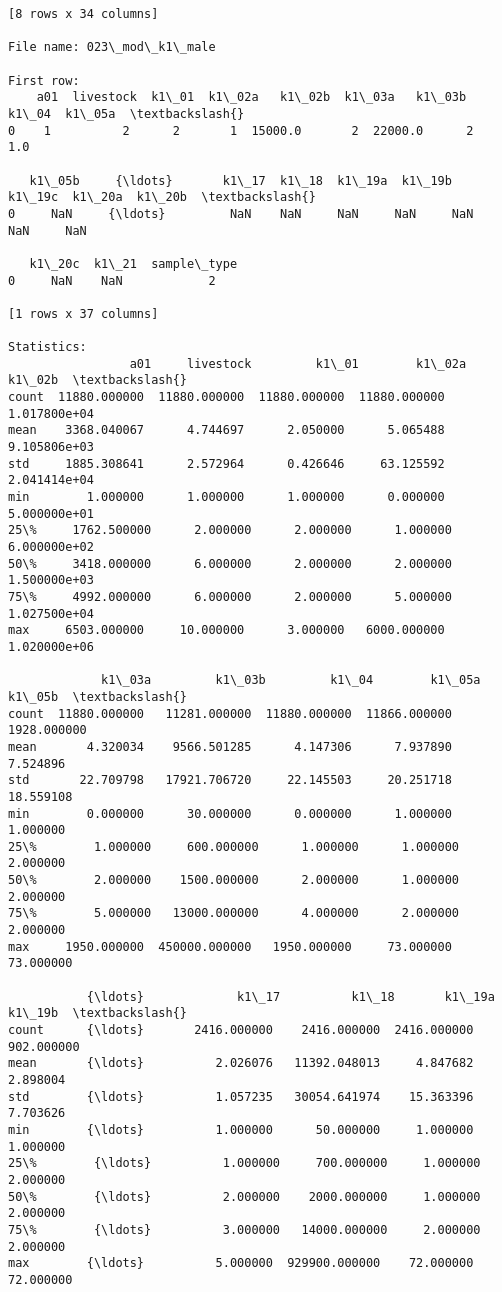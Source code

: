 \documentclass[11pt]{article}
\begin{document}
\begin{Verbatim}[commandchars=\\\{\}]
[8 rows x 34 columns]

File name: 023\_mod\_k1\_male

First row: 
    a01  livestock  k1\_01  k1\_02a   k1\_02b  k1\_03a   k1\_03b  k1\_04  k1\_05a  \textbackslash{}
0    1          2      2       1  15000.0       2  22000.0      2     1.0   

   k1\_05b     {\ldots}       k1\_17  k1\_18  k1\_19a  k1\_19b  k1\_19c  k1\_20a  k1\_20b  \textbackslash{}
0     NaN     {\ldots}         NaN    NaN     NaN     NaN     NaN     NaN     NaN   

   k1\_20c  k1\_21  sample\_type  
0     NaN    NaN            2  

[1 rows x 37 columns]

Statistics: 
                 a01     livestock         k1\_01        k1\_02a        k1\_02b  \textbackslash{}
count  11880.000000  11880.000000  11880.000000  11880.000000  1.017800e+04   
mean    3368.040067      4.744697      2.050000      5.065488  9.105806e+03   
std     1885.308641      2.572964      0.426646     63.125592  2.041414e+04   
min        1.000000      1.000000      1.000000      0.000000  5.000000e+01   
25\%     1762.500000      2.000000      2.000000      1.000000  6.000000e+02   
50\%     3418.000000      6.000000      2.000000      2.000000  1.500000e+03   
75\%     4992.000000      6.000000      2.000000      5.000000  1.027500e+04   
max     6503.000000     10.000000      3.000000   6000.000000  1.020000e+06   

             k1\_03a         k1\_03b         k1\_04        k1\_05a       k1\_05b  \textbackslash{}
count  11880.000000   11281.000000  11880.000000  11866.000000  1928.000000   
mean       4.320034    9566.501285      4.147306      7.937890     7.524896   
std       22.709798   17921.706720     22.145503     20.251718    18.559108   
min        0.000000      30.000000      0.000000      1.000000     1.000000   
25\%        1.000000     600.000000      1.000000      1.000000     2.000000   
50\%        2.000000    1500.000000      2.000000      1.000000     2.000000   
75\%        5.000000   13000.000000      4.000000      2.000000     2.000000   
max     1950.000000  450000.000000   1950.000000     73.000000    73.000000   

           {\ldots}             k1\_17          k1\_18       k1\_19a      k1\_19b  \textbackslash{}
count      {\ldots}       2416.000000    2416.000000  2416.000000  902.000000   
mean       {\ldots}          2.026076   11392.048013     4.847682    2.898004   
std        {\ldots}          1.057235   30054.641974    15.363396    7.703626   
min        {\ldots}          1.000000      50.000000     1.000000    1.000000   
25\%        {\ldots}          1.000000     700.000000     1.000000    2.000000   
50\%        {\ldots}          2.000000    2000.000000     1.000000    2.000000   
75\%        {\ldots}          3.000000   14000.000000     2.000000    2.000000   
max        {\ldots}          5.000000  929900.000000    72.000000   72.000000   


\end{Verbatim}
\end{document}
